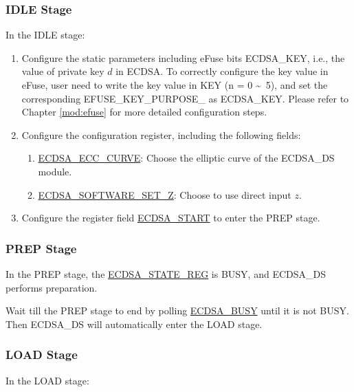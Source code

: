 \documentclass[main\_\_EN.tex]{subfiles}
\begin{document}
\subsubsection{IDLE Stage}
In the IDLE stage:
\begin{enumerate}
	\item Configure the static parameters including eFuse bits ECDSA\_KEY, i.e., the value of private key $d$ in ECDSA. To correctly configure the key value in eFuse, user need to write the key value in KEY (n = 0 \textasciitilde \ 5), and set the corresponding EFUSE\_KEY\_PURPOSE\_ as ECDSA\_KEY. Please refer to Chapter \ref{mod:efuse} \textit{} for more detailed configuration steps.
	\item Configure the configuration register, including the following fields:
	      \begin{enumerate}
		      \item \hyperref[fielddesc:ECDSAECCCURVE]{ECDSA\_ECC\_CURVE}: Choose the elliptic curve of the ECDSA\_DS module.
		      \item \hyperref[fielddesc:ECDSASOFTWARESETZ]{ECDSA\_SOFTWARE\_SET\_Z}: Choose to use direct input $z$.
	      \end{enumerate}
	\item Configure the register field \hyperref[fielddesc:ECDSASTART]{ECDSA\_START} to enter the PREP stage.
\end{enumerate}

\subsubsection{PREP Stage}

In the PREP stage, the \hyperref[regdesc:ECDSASTATEREG]{ECDSA\_STATE\_REG} is BUSY, and ECDSA\_DS performs preparation.

Wait till the PREP stage to end by polling \hyperref[fielddesc:ECDSABUSY]{ECDSA\_BUSY} until it is not BUSY. Then ECDSA\_DS will automatically enter the LOAD stage.

\subsubsection{LOAD Stage}
In the LOAD stage:
\end{document}
